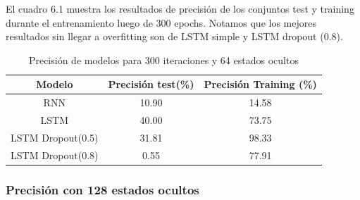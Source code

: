 \newpage
El cuadro 6.1 muestra los resultados de precisión de los conjuntos test y training durante el entrenamiento luego de 300 epochs. Notamos que los mejores resultados sin llegar a overfitting son de LSTM simple y LSTM dropout (0.8).
\begin{table}[H]
	\centering
	\begin{tabular}{|c|c|c|}
		\hline
		\rowcolor{Gray}  Modelo & Precisión test(\%) & Precisión Training (\%)\\ \hline
		RNN &      10.90   &                14.58  \\ \hline
		
		LSTM &        40.00 &          73.75       \\ \hline
		
		LSTM Dropout(0.5)&  31.81    &     98.33       \\ \hline
		
		LSTM Dropout(0.8)&	0.55		&	77.91		\\ \hline
		
	\end{tabular}
	\caption{Precisión de modelos para 300 iteraciones y 64 estados ocultos}
\end{table}


\subsubsection{Precisión con 128 estados ocultos}

